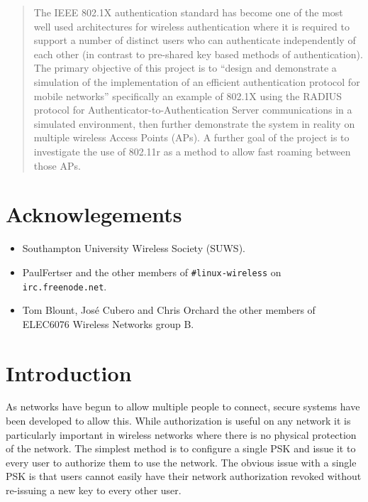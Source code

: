 \documentclass[pdftex, 12pt, a4paper]{article}
\begin{document}


\tableofcontents

\begin{abstract}
The IEEE 802.1X authentication standard has become one of the most well used architectures for wireless authentication where it is required to support a number of distinct users who can authenticate independently of each other (in contrast to pre-shared key based methods of authentication).  The primary objective of this project is to ``design and demonstrate a simulation of the implementation of an efficient authentication protocol for mobile networks'' specifically an example of 802.1X using the RADIUS protocol for Authenticator-to-Authentication Server communications in a simulated environment, then further demonstrate the system in reality on multiple wireless Access Points (APs). A further goal of the project is to investigate the use of 802.11r as a method to allow fast roaming between those APs.
\end{abstract}

\section*{Acknowlegements}
\begin{itemize}
  \item Southampton University Wireless Society (SUWS).
  \item PaulFertser and the other members of \verb`#linux-wireless` on \verb`irc.freenode.net`.
  \item Tom Blount, José Cubero and Chris Orchard the other members of ELEC6076 Wireless Networks group B.
\end{itemize}

\section{Introduction}
As networks have begun to allow multiple people to connect, secure systems have been developed to allow this.  While authorization is useful on any network it is particularly important in wireless networks where there is no physical protection of the network. The simplest method is to configure a single PSK and issue it to every user to authorize them to use the network. The obvious issue with a single PSK is that users cannot easily have their network authorization revoked without re-issuing a new key to every other user.
\end{document}
